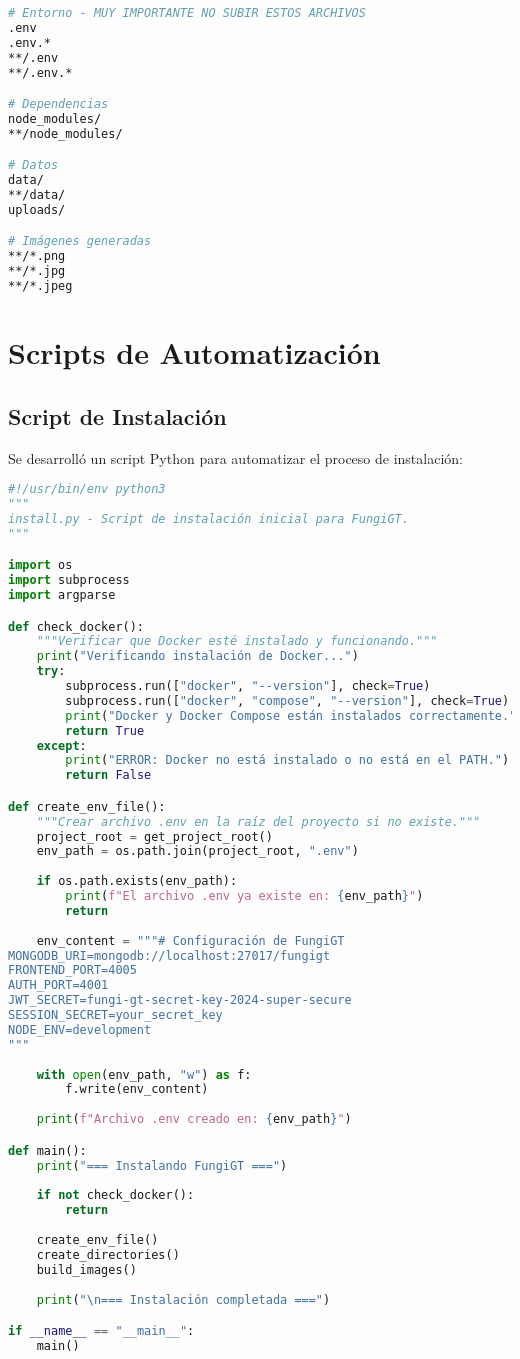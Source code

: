 \documentclass[12pt,a4paper]{article}
\begin{document}
\begin{lstlisting}[language=bash, caption=Configuración de .gitignore para seguridad]
# Entorno - MUY IMPORTANTE NO SUBIR ESTOS ARCHIVOS
.env
.env.*
**/.env
**/.env.*

# Dependencias
node_modules/
**/node_modules/

# Datos
data/
**/data/
uploads/

# Imágenes generadas
**/*.png
**/*.jpg
**/*.jpeg
\end{lstlisting}

\section{Scripts de Automatización}

\subsection{Script de Instalación}

Se desarrolló un script Python para automatizar el proceso de instalación:

\begin{lstlisting}[language=python, caption=Script de instalación automatizada]
#!/usr/bin/env python3
"""
install.py - Script de instalación inicial para FungiGT.
"""

import os
import subprocess
import argparse

def check_docker():
    """Verificar que Docker esté instalado y funcionando."""
    print("Verificando instalación de Docker...")
    try:
        subprocess.run(["docker", "--version"], check=True)
        subprocess.run(["docker", "compose", "--version"], check=True)
        print("Docker y Docker Compose están instalados correctamente.")
        return True
    except:
        print("ERROR: Docker no está instalado o no está en el PATH.")
        return False

def create_env_file():
    """Crear archivo .env en la raíz del proyecto si no existe."""
    project_root = get_project_root()
    env_path = os.path.join(project_root, ".env")
    
    if os.path.exists(env_path):
        print(f"El archivo .env ya existe en: {env_path}")
        return
    
    env_content = """# Configuración de FungiGT
MONGODB_URI=mongodb://localhost:27017/fungigt
FRONTEND_PORT=4005
AUTH_PORT=4001
JWT_SECRET=fungi-gt-secret-key-2024-super-secure
SESSION_SECRET=your_secret_key
NODE_ENV=development
"""
    
    with open(env_path, "w") as f:
        f.write(env_content)
    
    print(f"Archivo .env creado en: {env_path}")

def main():
    print("=== Instalando FungiGT ===")
    
    if not check_docker():
        return
    
    create_env_file()
    create_directories()
    build_images()
    
    print("\n=== Instalación completada ===")

if __name__ == "__main__":
    main()
\end{lstlisting}
\end{document}
